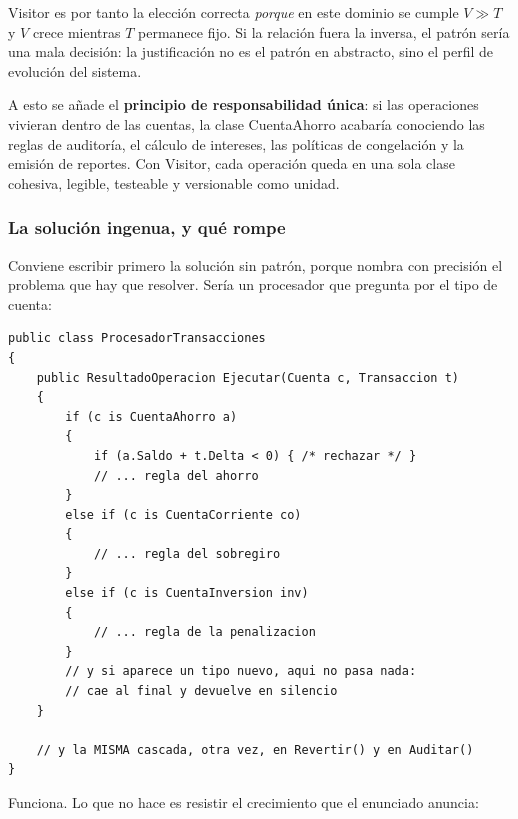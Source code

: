 Visitor es por tanto la elección correcta \emph{porque} en este dominio se cumple $V \gg T$ y
$V$ crece mientras $T$ permanece fijo. Si la relación fuera la inversa, el patrón sería una
mala decisión: la justificación no es el patrón en abstracto, sino el perfil de evolución del
sistema.

A esto se añade el \textbf{principio de responsabilidad única}: si las operaciones vivieran
dentro de las cuentas, la clase CuentaAhorro acabaría conociendo las reglas de auditoría, el
cálculo de intereses, las políticas de congelación y la emisión de reportes. Con Visitor, cada
operación queda en una sola clase cohesiva, legible, testeable y versionable como unidad.

\subsubsection*{La solución ingenua, y qué rompe}

Conviene escribir primero la solución sin patrón, porque nombra con precisión el problema que
hay que resolver. Sería un procesador que pregunta por el tipo de cuenta:

{\small
\begin{verbatim}
public class ProcesadorTransacciones
{
    public ResultadoOperacion Ejecutar(Cuenta c, Transaccion t)
    {
        if (c is CuentaAhorro a)
        {
            if (a.Saldo + t.Delta < 0) { /* rechazar */ }
            // ... regla del ahorro
        }
        else if (c is CuentaCorriente co)
        {
            // ... regla del sobregiro
        }
        else if (c is CuentaInversion inv)
        {
            // ... regla de la penalizacion
        }
        // y si aparece un tipo nuevo, aqui no pasa nada:
        // cae al final y devuelve en silencio
    }

    // y la MISMA cascada, otra vez, en Revertir() y en Auditar()
}
\end{verbatim}
}

Funciona. Lo que no hace es resistir el crecimiento que el enunciado anuncia:

